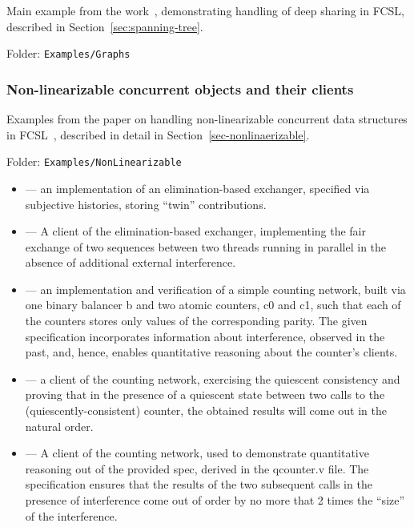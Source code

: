 Main example from the work~\cite{Sergey-al:PLDI15}, demonstrating
handling of deep sharing in FCSL, described in
Section~\ref{sec:spanning-tree}.

Folder: \texttt{Examples/Graphs}

\subsubsection{Non-linearizable concurrent objects and their clients}
\label{sec:non-line-conc}

Examples from the paper on handling non-linearizable concurrent data
structures in FCSL~\cite{Sergey-al:OOPSLA16}, described in detail in
Section~\ref{sec-nonlinaerizable}.

Folder: \texttt{Examples/NonLinearizable}

\begin{itemize}

\item {} --- an implementation of an elimination-based
  exchanger, specified via subjective histories, storing ``twin''
  contributions. %

\item {} --- A client of the elimination-based
  exchanger, implementing the fair exchange of two sequences between
  two threads running in parallel in the absence of additional
  external interference. %

\item {} --- an implementation and verification of a
  simple counting network, built via one binary balancer b and two
  atomic counters, c0 and c1, such that each of the counters stores
  only values of the corresponding parity. The given specification
  incorporates information about interference, observed in the past,
  and, hence, enables quantitative reasoning about the counter's
  clients. %

\item {} --- a client of the counting network,
  exercising the quiescent consistency and proving that in the
  presence of a quiescent state between two calls to the
  (quiescently-consistent) counter, the obtained results will come out
  in the natural order. %

\item {} --- A client of the counting network,
  used to demonstrate quantitative reasoning out of the provided spec,
  derived in the qcounter.v file. The specification ensures that the
  results of the two subsequent calls in the presence of interference
  come out of order by no more that 2 times the ``size'' of the
  interference. %

\end{itemize}

